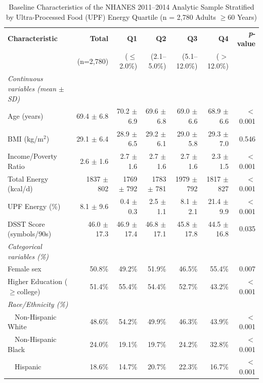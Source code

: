 \documentclass[journal,twoside,10pt]{IEEEtran}
\begin{document}
\begin{table}[!t]
\renewcommand{\arraystretch}{1.15}
\caption{Baseline Characteristics of the NHANES 2011--2014 Analytic Sample Stratified by Ultra-Processed Food (UPF) Energy Quartile (n = 2,780 Adults $\geq$60 Years)}
\label{tab:table1}
\centering
\small
\begin{tabular}{lrrrrrr}
\hline\hline
\textbf{Characteristic} & \textbf{Total} & \textbf{Q1} & \textbf{Q2} & \textbf{Q3} & \textbf{Q4} & \textbf{\textit{p}-value} \\
                         & (n=2,780)      & ($\leq$2.0\%) & (2.1--5.0\%) & (5.1--12.0\%) & ($>$12.0\%) & \\
\hline
\textit{Continuous variables (mean $\pm$ SD)} & & & & & & \\
Age (years)              & 69.4 $\pm$ 6.8 & 70.2 $\pm$ 6.9 & 69.6 $\pm$ 6.8 & 69.0 $\pm$ 6.6 & 68.9 $\pm$ 6.6 & $<$0.001 \\
BMI (kg/m$^2$)           & 29.1 $\pm$ 6.4 & 28.9 $\pm$ 6.5 & 29.2 $\pm$ 6.1 & 29.0 $\pm$ 5.8 & 29.3 $\pm$ 7.0 & 0.546 \\
Income/Poverty Ratio     & 2.6 $\pm$ 1.6  & 2.7 $\pm$ 1.6  & 2.7 $\pm$ 1.6  & 2.7 $\pm$ 1.6  & 2.3 $\pm$ 1.5  & $<$0.001 \\
Total Energy (kcal/d)    & 1837 $\pm$ 802 & 1769 $\pm$ 792 & 1783 $\pm$ 781 & 1979 $\pm$ 792 & 1817 $\pm$ 827 & $<$0.001 \\
UPF Energy (\%)          & 8.1 $\pm$ 9.6  & 0.4 $\pm$ 0.3  & 2.5 $\pm$ 1.1  & 8.1 $\pm$ 2.1  & 21.4 $\pm$ 9.9 & $<$0.001 \\
DSST Score (symbols/90s) & 46.0 $\pm$ 17.3& 46.9 $\pm$ 17.4& 46.8 $\pm$ 17.1& 45.8 $\pm$ 17.8& 44.5 $\pm$ 16.8& 0.035 \\
\hline
\textit{Categorical variables (\%)} & & & & & & \\
Female sex               & 50.8\%  & 49.2\%  & 51.9\%  & 46.5\%  & 55.4\%  & 0.007 \\
Higher Education ($\geq$college) & 51.4\% & 55.4\% & 54.4\% & 52.7\% & 43.2\% & $<$0.001 \\
\hline
\textit{Race/Ethnicity (\%)} & & & & & & \\
~~Non-Hispanic White    & 48.6\%  & 54.2\%  & 49.9\%  & 46.3\%  & 43.9\%  & $<$0.001 \\
~~Non-Hispanic Black    & 24.0\%  & 19.1\%  & 19.7\%  & 24.2\%  & 32.8\%  & $<$0.001 \\
~~Hispanic              & 18.6\%  & 14.7\%  & 20.7\%  & 22.3\%  & 16.7\%  & $<$0.001 \\

\end{tabular}
\end{table}
\end{document}

